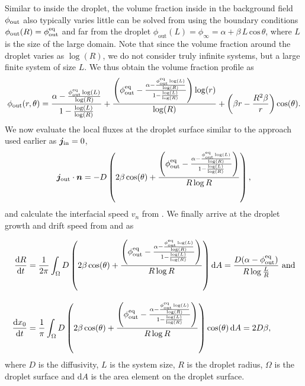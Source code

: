 \begin{appendices}
Similar to inside the droplet, the volume fraction inside in the background field $\phi_\mathrm{out}$ also typically varies little can be solved from  using the boundary conditions $\phi_\mathrm{out}(R) = \phi^\mathrm{eq}_\mathrm{out}$ and far from the droplet $\phi_\mathrm{out}(L) = \phi_{\infty} = \alpha + \beta \, L \, \text{cos}\,\theta$, where $L$ is the size of the large domain.
Note that since the volume fraction around the droplet varies as $\log(R)$, we do not consider truly infinite systems, but a large finite system of size $L$.
We thus obtain the volume fraction profile as 
\begin{equation*}
\phi_\mathrm{out}(r, \theta) = \frac{\alpha - \frac {\phi^\mathrm{eq}_\mathrm{out} \log(L) } { \log(R)}} { 1 - \frac{\log(L)}{\log(R)} } + \frac{\left ( \phi^\mathrm{eq}_\mathrm{out} - \frac{\alpha - \frac {\phi^\mathrm{eq}_\mathrm{out} \log(L) } {\log(R)}} { 1 - \frac{\log(L)}{\log(R)} } \right ) \log(r)}{\log(R)} + \left (\beta r - \frac{R^2 \beta}{r} \right ) \cos(\theta).
\end{equation*}
We now evaluate the local fluxes at the droplet surface similar to the approach used earlier as $\boldsymbol{j}_\mathrm{in} = 0$,
\begin{equation*}
    \boldsymbol{j}_\mathrm{out} \cdot \boldsymbol{n}= -D \left( 2 \beta \cos(\theta) +\frac{\left ( \phi^\mathrm{eq}_\mathrm{out} - \frac{\alpha - \frac {\phi^\mathrm{eq}_\mathrm{out} \log(L) } {\log(R)}} { 1 - \frac{\log(L)}{\log(R)} } \right )}{R \log R} \right ), 
\end{equation*}
and calculate the interfacial speed $v_n$ from .
We finally arrive at the droplet growth and drift speed from  and  as

\begin{subequations}
\label{eqn:interfacefluxes_gradient_2D}
\begin{align}
	\frac{\mathrm{d} R}{\mathrm{d} t} &= \frac{1}{2 \pi} \int_{\Omega} D \left( 2 \beta \cos(\theta) +\frac{\left ( \phi^\mathrm{eq}_\mathrm{out} - \frac{\alpha - \frac {\phi^\mathrm{eq}_\mathrm{out} \log(L) } { \log(R)}} { 1 - \frac{\log(L)}{\log(R)} } \right )}{R \log R} \right ) \mathrm{d}A = \frac{D (\alpha - \phi^\mathrm{eq}_\mathrm{out})}{R \log \frac{L}{R}}
	\text{~and}
    \\[10pt]
    \frac{\mathrm{d} x_0}{\mathrm{d} t} &= \frac{1}{\pi} \int_{\Omega} D \left( 2 \beta \cos(\theta) +\frac{\left ( \phi^\mathrm{eq}_\mathrm{out} - \frac{\alpha - \frac {\phi^\mathrm{eq}_\mathrm{out} \log(L) } {\log(R)}} { 1 - \frac{\log(L)}{\log(R)} } \right )}{R \log R} \right ) \cos(\theta) \, \mathrm{d}A = 2 D \beta,
\end{align}
\end{subequations}
where $D$ is the diffusivity, $L$ is the system size, $R$ is the droplet radius, $\Omega$ is the droplet surface and $\mathrm{d} A$ is the area element on the droplet surface.


\end{appendices}
